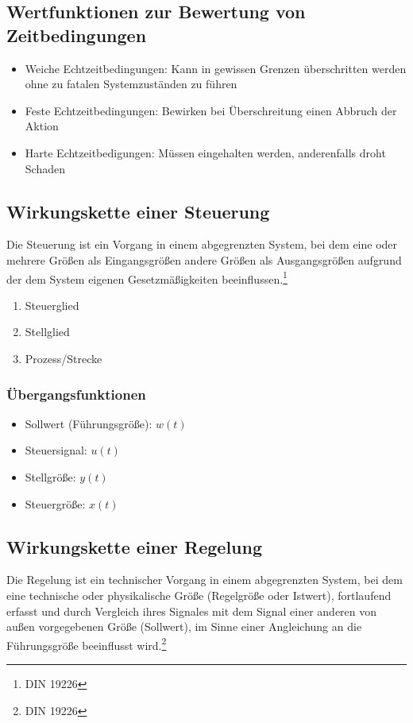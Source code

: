 \subsection{Wertfunktionen zur Bewertung von Zeitbedingungen}
\begin{itemize}
	\item Weiche Echtzeitbedingungen: Kann in gewissen Grenzen überschritten werden ohne zu fatalen Systemzuständen zu führen
	\item Feste Echtzeitbedingungen: Bewirken bei Überschreitung einen Abbruch der Aktion
	\item Harte Echtzeitbedigungen: Müssen eingehalten werden, anderenfalls droht Schaden
\end{itemize}


\subsection{Wirkungskette einer Steuerung}
Die Steuerung ist ein Vorgang in einem abgegrenzten System, bei dem eine oder mehrere Größen als Eingangsgrößen andere Größen als Ausgangsgrößen aufgrund der dem System eigenen Gesetzmäßigkeiten beeinflussen.\footnote{DIN 19226}
\begin{enumerate}
	\item Steuerglied
	\item Stellglied
	\item Prozess/Strecke
\end{enumerate}

\subsubsection{Übergangsfunktionen}
\begin{itemize}
	\item Sollwert (Führungsgröße): \(w(t)\)
	\item Steuersignal: \(u(t)\)
	\item Stellgröße: \(y(t)\)
	\item Steuergröße: \(x(t)\)
\end{itemize}

\subsection{Wirkungskette einer Regelung}
Die Regelung ist ein technischer Vorgang in einem abgegrenzten System, bei dem eine technische oder physikalische Größe (Regelgröße oder Istwert), fortlaufend erfasst und durch Vergleich ihres Signales mit dem Signal einer anderen von außen vorgegebenen Größe (Sollwert), im Sinne einer Angleichung an die Führungsgröße beeinflusst wird.\footnote{DIN 19226}

